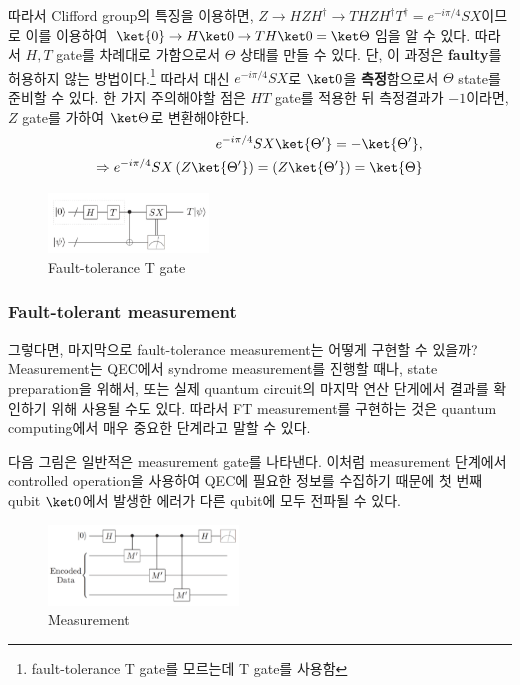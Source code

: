 따라서 Clifford group의 특징을 이용하면, $Z \rightarrow HZH^\dagger \rightarrow THZH^\dagger T^\dagger = e^{-i\pi/4} SX$이므로 이를 이용하여 $\ket{0} \rightarrow H\ket 0 \rightarrow TH \ket 0 = \ket \Theta$임을 알 수 있다. 따라서 $H, T$ gate를 차례대로 가함으로서 $\Theta$ 상태를 만들 수 있다.
단, 이 과정은 \textbf{faulty}를 허용하지 않는 방법이다.\footnote{fault-tolerance T gate를 모르는데 T gate를 사용함} 따라서 대신 $e^{-i \pi/4} SX$로 $\ket 0$을 \textbf{측정}함으로서 $\Theta$ state를 준비할 수 있다. 한 가지 주의해야할 점은 $HT$ gate를 적용한 뒤 측정결과가 $-1$이라면, $Z$ gate를 가하여 $\ket \Theta$로 변환해야한다.
\begin{align*}
    e^{-i \pi/4} SX \ket{\Theta'} = - \ket{\Theta'},\\
    \Rightarrow e^{-i \pi/4} SX \left(Z\ket{\Theta'}\right) =  \left(Z\ket{\Theta'}\right) = \ket{\Theta}
\end{align*}
\begin{figure}[h]
    \centering
    \includegraphics[width=0.38\textwidth]{figures/C7_FT_T.png}
    \caption{Fault-tolerance T gate}
\end{figure}

\subsubsection{Fault-tolerant measurement}
그렇다면, 마지막으로 fault-tolerance measurement는 어떻게 구현할 수 있을까? Measurement는 QEC에서 syndrome measurement를 진행할 때나, state preparation을 위해서, 또는 실제 quantum circuit의 마지막 연산 단게에서 결과를 확인하기 위해 사용될 수도 있다.
따라서 FT measurement를 구현하는 것은 quantum computing에서 매우 중요한 단계라고 말할 수 있다. 

다음 그림은 일반적은 measurement gate를 나타낸다. 이처럼 measurement 단계에서 controlled operation을 사용하여 QEC에 필요한 정보를 수집하기 때문에 첫 번째 qubit $\ket 0$에서 발생한 에러가 다른 qubit에 모두 전파될 수 있다. 
\begin{figure}[h]
    \centering
    \includegraphics[width=0.45\textwidth]{figures/C7_QEC_measurement.png}
    \caption{Measurement}
\end{figure}


